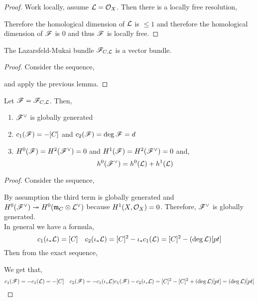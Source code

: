 \documentclass[12pt]{article}
\begin{document}
\begin{proof}
Work locally, assume $\mathcal{L} = \mathcal{O}_{X}$. Then there is a locally free resolution,
\begin{center}
\end{center}
Therefore the homological dimension of $\mathcal{L}$ is $\le 1$ and therefore the homological dimension of $\mathscr{F}$ is $0$ and thus $\mathscr{F}$ is locally free.
\end{proof}

\begin{cor}
The Lazarsfeld-Mukai bundle $\mathscr{F}_{C,\mathcal{L}}$ is a vector bundle.
\end{cor}

\begin{proof}
Consider the sequence,
\begin{center}
\end{center}
and apply the previous lemma.
\end{proof}

\begin{lemma}
Let $\mathscr{F} = \mathscr{F}_{C, \mathcal{L}}$. Then,
\begin{enumerate}
\item $\mathscr{F}^\vee$ is globally generated
\item $c_1(\mathscr{F}) = -[C]$ and $c_2(\mathscr{F}) = \deg{\mathscr{F}} = d$
\item $H^0(\mathscr{F}) = H^2(\mathscr{F}^\vee) = 0$ and $H^1(\mathscr{F}) = H^2(\mathscr{F}^\vee) = 0$ and,
\[ h^0(\mathscr{F}^\vee) = h^0(\mathcal{L}) + h^1(\mathcal{L}) \]
\end{enumerate}
\end{lemma}

\begin{proof}
Consider the sequence,
\begin{center}
\end{center}
By assumption the third term is globally generated and $H^0(\mathscr{F}^\vee) \twoheadrightarrow H^0(\mathfrak{m}
_C \otimes \mathcal{L}^\vee)$ because $H^1(X, \mathcal{O}_{X}) = 0$. Therefore, $\mathscr{F}^\vee$ is globally generated.
\bigskip\\
In general we have a formula,
\[ c_1(\iota_* \mathcal{L}) = [C] \quad c_2(\iota_* \mathcal{L}) = [C]^2 - \iota_* c_1(\mathcal{L}) = [C]^2 - (\deg{\mathcal{L}}) [pt] \]
Then from the exact sequence,
\begin{center}
\end{center}
We get that,
\[ c_1(\mathscr{F}) = - c_1(\mathcal{L}) = -[C] \quad c_2(\mathscr{F}) = -c_1(\iota_* \mathcal{L}) c_1(\mathscr{F}) - c_2(\iota_* \mathcal{L}) = [C]^2  - [C]^2 + (\deg{\mathcal{L}}) [pt] = (\deg{\mathcal{L}}) [pt] \]
\end{proof}
\end{document}
